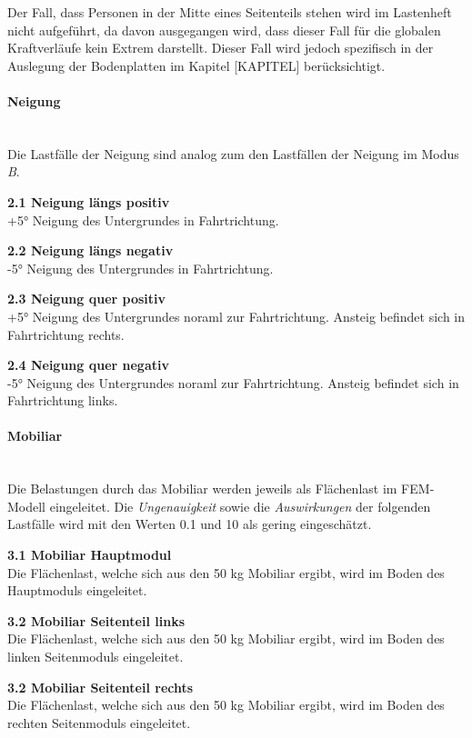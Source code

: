 Der Fall, dass Personen in der Mitte eines Seitenteils stehen wird im Lastenheft nicht aufgeführt, da davon ausgegangen wird, dass dieser Fall für die globalen Kraftverläufe kein Extrem darstellt. Dieser Fall wird jedoch spezifisch in der Auslegung der Bodenplatten im Kapitel [KAPITEL] berücksichtigt.

\paragraph{Neigung}\mbox{}\\
Die Lastfälle der Neigung sind analog zum den Lastfällen der Neigung im Modus \emph{B}.
\begin{description}
  \item \textbf{2.1 Neigung längs positiv}\\
  +5° Neigung des Untergrundes in Fahrtrichtung.
  \item \textbf{2.2 Neigung längs negativ}\\
  -5° Neigung des Untergrundes in Fahrtrichtung.
  \item \textbf{2.3 Neigung quer positiv}\\
  +5° Neigung des Untergrundes noraml zur Fahrtrichtung. Ansteig befindet sich in Fahrtrichtung rechts.
  \item \textbf{2.4 Neigung quer negativ}\\
  -5° Neigung des Untergrundes noraml zur Fahrtrichtung. Ansteig befindet sich in Fahrtrichtung links.
\end{description}

\paragraph{Mobiliar}\mbox{}\\
Die Belastungen durch das Mobiliar werden jeweils als Flächenlast im FEM-Modell eingeleitet. Die \emph{Ungenauigkeit} sowie die \emph{Auswirkungen} der folgenden Lastfälle wird mit den Werten 0.1 und 10 als gering eingeschätzt.
\begin{description}
  \item \textbf{3.1 Mobiliar Hauptmodul}\\
  Die Flächenlast, welche sich aus den 50 kg Mobiliar ergibt, wird im Boden des Hauptmoduls eingeleitet.
  \item \textbf{3.2 Mobiliar Seitenteil links}\\
  Die Flächenlast, welche sich aus den 50 kg Mobiliar ergibt, wird im Boden des linken Seitenmoduls eingeleitet.
  \item \textbf{3.2 Mobiliar Seitenteil rechts}\\
  Die Flächenlast, welche sich aus den 50 kg Mobiliar ergibt, wird im Boden des rechten Seitenmoduls eingeleitet.
\end{description}

